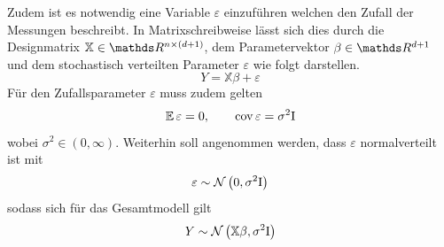 		Zudem ist es notwendig eine Variable $\varepsilon$ einzuführen welchen den Zufall der Messungen beschreibt.
	    In Matrixschreibweise lässt sich dies durch die Designmatrix $\mathbb{X} \in \SR^{n \times (d+1)}$, dem Parametervektor $\beta \in \SR^{d+1}$ und dem stochastisch  verteilten Parameter $\varepsilon$ wie folgt darstellen.
		\[
			Y = \mathbb{X}\beta + \varepsilon
		\]
		Für den Zufallsparameter $\varepsilon$ muss zudem gelten
		\[
			\operatorname{\mathbb{E}} \varepsilon = 0, \qquad \operatorname{cov} \varepsilon = \sigma^2 \mathrm{I}
		\]
		wobei $\sigma^2 \in (0,\infty)$.
		Weiterhin soll angenommen werden, dass $\varepsilon$ normalverteilt ist mit
	    \[
			\varepsilon \sim \mathcal{N} \left( 0,\sigma^2\mathrm{I} \right)
		\]
	    sodass sich für das Gesamtmodell gilt
		\[
			Y \sim \mathcal{N} \left( \mathbb{X}\beta,\sigma^2 \mathrm{I} \right)
		\]


